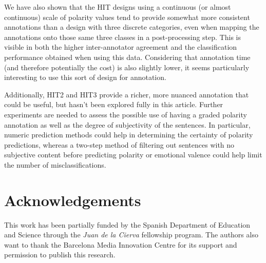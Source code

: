 \documentclass[11pt]{elsarticle}
\begin{document}
We have also shown that the HIT designs using a continuous (or almost continuous) scale of polarity values tend to provide somewhat more consistent annotations than a design with three discrete categories, even when mapping the annotations onto those same three classes in a post-processing step. This is visible in both the higher inter-annotator agreement and the classification performance obtained when using this data. Considering that annotation time (and therefore potentially the cost) is also slightly lower, it seems particularly interesting to use this sort of design for annotation.

Additionally, HIT2 and HIT3 provide a richer, more nuanced annotation that could be useful, but hasn't been explored fully in this article. Further experiments are needed to assess the possible use of having a graded polarity annotation as well as the degree of subjectivity of the sentences. In particular, numeric prediction methods could help in determining the certainty of polarity predictions, whereas a two-step method of filtering out sentences with no subjective content before predicting polarity or emotional valence could help limit the number of misclassifications.

\section*{Acknowledgements}

This work has been partially funded by the Spanish Department of Education and Science through the \textit{Juan de la Cierva} fellowship program. The authors also want to thank the Barcelona Media Innovation Centre for its support and permission to publish this research.



\end{document}
